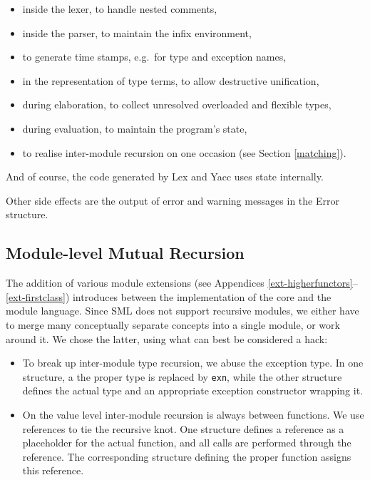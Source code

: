 \documentclass[twoside,titlepage]{article}
\begin{document}
\begin{itemize}
\setlength{\parskip}{0ex}
\item inside the lexer, to handle nested comments,
\item inside the parser, to maintain the infix environment,
\item to generate time stamps, e.g.\ for type and exception names,
\item in the representation of type terms, to allow destructive unification,
\item during elaboration, to collect unresolved overloaded and flexible types,
\item during evaluation, to maintain the program's state,
\item to realise inter-module recursion on one occasion (see Section \ref{matching}).
\end{itemize}

And of course, the code generated by Lex and Yacc uses state internally.

Other side effects are the output of error and warning messages in the Error structure.


\subsection{Module-level Mutual Recursion}
\label{modulerecursion}

The addition of various module extensions (see Appendices \ref{ext-higherfunctors}--\ref{ext-firstclass}) introduces between the implementation of the core and the module language. Since SML does not support recursive modules, we either have to merge many conceptually separate concepts into a single module, or work around it. We chose the latter, using what can best be considered a hack:
\begin{itemize}
\item To break up inter-module type recursion, we abuse the exception type. In one structure, a the proper type is replaced by {\tt exn}, while the other structure defines the actual type and an appropriate exception constructor wrapping it.

\item On the value level inter-module recursion is always between functions. We use references to tie the recursive knot. One structure defines a reference as a placeholder for the actual function, and all calls are performed through the reference. The corresponding structure defining the proper function assigns this reference.
\end{itemize}
\end{document}

